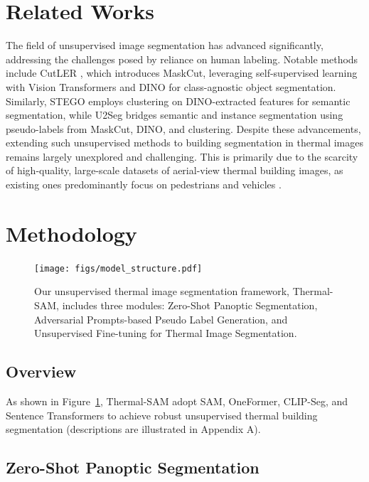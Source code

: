 \documentclass{article}
\theoremstyle{plain}
\theoremstyle{definition}
\theoremstyle{remark}
\begin{document}
\section{Related Works}

The field of unsupervised image segmentation has advanced significantly, addressing the challenges posed by reliance on human labeling. Notable methods include CutLER \cite{wang2023cut}, which introduces MaskCut, leveraging self-supervised learning with Vision Transformers \cite{dosovitskiy2020image} and DINO \cite{caron2021emerging} for class-agnostic object segmentation. Similarly, STEGO \cite{hamiltonunsupervised} employs clustering on DINO-extracted features for semantic segmentation, while U2Seg \cite{niu2024unsupervised} bridges semantic and instance segmentation using pseudo-labels from MaskCut, DINO, and clustering.  Despite these advancements, extending such unsupervised methods to building segmentation in thermal images remains largely unexplored and challenging. This is primarily due to the scarcity of high-quality, large-scale datasets of aerial-view thermal building images, as existing ones predominantly focus on pedestrians and vehicles \cite{liu2018real, li2020segmenting}.


\section{Methodology}



\begin{figure}[t]
\centering
\centerline{\texttt{[image: figs/model\_structure.pdf]}}
\caption{Our unsupervised thermal image segmentation framework, Thermal-SAM, includes three modules: Zero-Shot Panoptic Segmentation, Adversarial Prompts-based Pseudo Label Generation, and Unsupervised Fine-tuning for Thermal Image Segmentation. }
\label{model}
\end{figure}

\subsection{Overview}

As shown in Figure~\ref{model}, Thermal-SAM adopt SAM, OneFormer, CLIP-Seg, and Sentence Transformers to achieve robust unsupervised thermal building segmentation (descriptions are illustrated in Appendix A).



\subsection{Zero-Shot Panoptic Segmentation}
\end{document}
